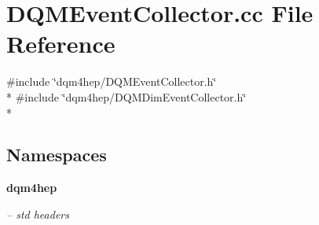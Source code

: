 \section{D\+Q\+M\+Event\+Collector.\+cc File Reference}
\label{DQMEventCollector_8cc}
{\ttfamily \#include \char`\"{}dqm4hep/\+D\+Q\+M\+Event\+Collector.\+h\char`\"{}}\\*
{\ttfamily \#include \char`\"{}dqm4hep/\+D\+Q\+M\+Dim\+Event\+Collector.\+h\char`\"{}}\\*
\subsection*{Namespaces}
\begin{DoxyCompactItemize}
\item 
 {\bf dqm4hep}
\begin{DoxyCompactList}\small\item\em -- std headers \end{DoxyCompactList}\end{DoxyCompactItemize}
